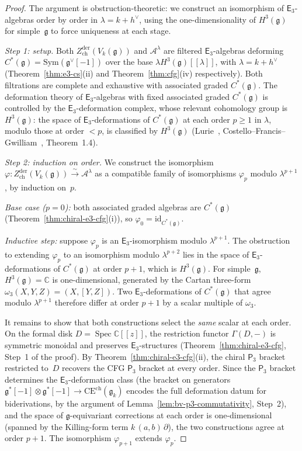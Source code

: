 \documentclass[11pt,reqno]{amsart}
\theoremstyle{definition}
\theoremstyle{remark}
\newcommand{\cA}{\mathcal{A}}
\newcommand{\CE}{\mathrm{CE}}
\newcommand{\Ethree}{\mathsf{E}_{3}}
\newcommand{\Pthree}{\mathsf{P}_{3}}
\newcommand{\Sym}{\mathrm{Sym}}
\DeclareMathOperator{\Spec}{Spec}
\newcommand{\fg}{\mathfrak{g}}
\newcommand{\CC}{\mathbb{C}}
\numberwithin{equation}{section}
\begin{document}
\begin{proof}
The argument is obstruction-theoretic: we construct an
isomorphism of $\Ethree$-algebras order by order in
$\lambda = k + h^\vee$, using the one-dimensionality of
$H^3(\fg)$ for simple~$\fg$ to force uniqueness at each
stage.

\smallskip
\noindent\textit{Step 1: setup.}
Both $Z^{\mathrm{der}}_{\mathrm{ch}}(V_k(\fg))$ and
$\cA^\lambda$ are filtered $\Ethree$-algebras deforming
$C^*(\fg) = \Sym(\fg^\vee[-1])$ over the base
$\lambda H^3(\fg)[[\lambda]]$, with $\lambda = k + h^\vee$
(Theorem~\ref{thm:e3-cs}(ii) and
Theorem~\ref{thm:cfg}(iv) respectively).
Both filtrations are complete and exhaustive with
associated graded $C^*(\fg)$.
The deformation theory of $\Ethree$-algebras with fixed
associated graded $C^*(\fg)$ is controlled by the
$\Ethree$-deformation complex, whose relevant cohomology
group is $H^3(\fg)$: the space of $\Ethree$-deformations
of $C^*(\fg)$ at each order $p \geq 1$ in $\lambda$,
modulo those at order $< p$, is classified by
$H^3(\fg)$ (Lurie~\cite{HA},
Costello--Francis--Gwilliam~\cite{CFG26},
Theorem~1.4).

\smallskip
\noindent\textit{Step 2: induction on order.}
We construct the isomorphism
$\varphi \colon Z^{\mathrm{der}}_{\mathrm{ch}}(V_k(\fg))
\xrightarrow{\sim} \cA^\lambda$ as a compatible family of
isomorphisms $\varphi_p$ modulo $\lambda^{p+1}$, by
induction on~$p$.

\emph{Base case ($p = 0$):} both associated graded
algebras are $C^*(\fg)$
(Theorem~\ref{thm:chiral-e3-cfg}(i)), so
$\varphi_0 = \mathrm{id}_{C^*(\fg)}$.

\emph{Inductive step:} suppose $\varphi_p$ is an
$\Ethree$-isomorphism modulo $\lambda^{p+1}$.
The obstruction to extending $\varphi_p$ to an
isomorphism modulo $\lambda^{p+2}$ lies in the
space of $\Ethree$-deformations of $C^*(\fg)$ at
order $p+1$, which is $H^3(\fg)$. For simple~$\fg$,
$H^3(\fg) = \CC$ is one-dimensional, generated by the
Cartan three-form
$\omega_3(X, Y, Z) = (X, [Y, Z])$.
Two $\Ethree$-deformations of $C^*(\fg)$
that agree modulo $\lambda^{p+1}$ therefore differ at order
$p+1$ by a scalar multiple of $\omega_3$.

It remains to show that both constructions select the
\emph{same} scalar at each order. On the formal disk
$D = \Spec \CC[[z]]$, the restriction functor
$\Gamma(D, -)$ is symmetric monoidal and preserves
$\Ethree$-structures
(Theorem~\ref{thm:chiral-e3-cfg}, Step~1 of the
proof). By Theorem~\ref{thm:chiral-e3-cfg}(ii), the
chiral $\Pthree$ bracket restricted to~$D$ recovers
the CFG $\Pthree$ bracket at every order. Since the
$\Pthree$ bracket determines the $\Ethree$-deformation
class (the bracket on generators
$\fg^*[-1] \otimes \fg^*[-1] \to \CE^{\mathrm{ch}}(\fg_k)$
encodes the full deformation datum for biderivations, by
the argument of
Lemma~\ref{lem:bv-p3-commutativity}, Step~2), and the
space of $\fg$-equivariant corrections at each order is
one-dimensional (spanned by the Killing-form term
$k\,(a,b)\,\partial$), the two constructions agree at
order $p+1$. The isomorphism $\varphi_{p+1}$ extends
$\varphi_p$.


\end{proof}
\end{document}
